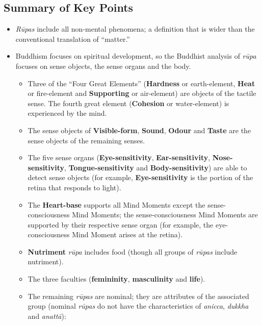 \pagebreak

\subsection*{Summary of Key Points}

\begin{itemize}

\item \textit{Rūpas} include all non-mental phenomena; a definition that is wider than the conventional translation of “matter.”

\item Buddhism focuses on spiritual development, so the Buddhist analysis of \textit{rūpa} focuses on sense objects, the sense organs and the body. 

\begin{itemize}

\item Three of the “Four Great Elements” (\textbf{Hardness} or earth-element, \textbf{Heat} or fire-element and \textbf{Supporting} or air-element) are objects of the tactile sense. The fourth great element (\textbf{Cohesion} or water-element) is experienced by the mind.

\item The sense objects of \textbf{Visible-form}, \textbf{Sound}, \textbf{Odour} and \textbf{Taste} are the sense objects of the remaining senses.

\item The five sense organs (\textbf{Eye-sensitivity}, \textbf{Ear-sensitivity}, \textbf{Nose-sensitivity}, \textbf{Tongue-sensitivity} and \textbf{Body-sensitivity}) are able to detect sense objects (for example, \textbf{Eye-sensitivity} is the portion of the retina that responds to light).

\item The \textbf{Heart-base} supports all Mind Moments except the sense-consciousness Mind Moments; the sense-consciousness Mind Moments are supported by their respective sense organ (for example, the eye-consciousness Mind Moment arises at the retina).

\item \textbf{Nutriment} \textit{rūpa} includes food (though all groups of \textit{rūpas} include nutriment).

\item The three faculties (\textbf{femininity}, \textbf{masculinity} and \textbf{life}).

\item The remaining \textit{rūpas} are nominal; they are attributes of the associated group (nominal \textit{rūpas} do not have the characteristics of \textit{anicca}, \textit{dukkha} and \textit{anattā}):


\end{itemize}
\end{itemize}
